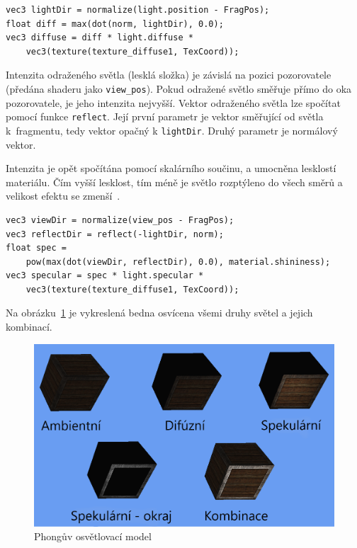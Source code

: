 \documentclass[thesis=M,czech]{FITthesis}[2019/12/23]
\begin{document}
\begin{verbatim}
vec3 lightDir = normalize(light.position - FragPos);
float diff = max(dot(norm, lightDir), 0.0);
vec3 diffuse = diff * light.diffuse * 
    vec3(texture(texture_diffuse1, TexCoord));
\end{verbatim}

Intenzita odraženého světla (lesklá složka) je závislá na pozici pozorovatele (předána shaderu jako \texttt{view\_pos}). Pokud odražené světlo směřuje přímo do oka pozorovatele, je jeho intenzita nejvyšší. Vektor odraženého světla lze spočítat pomocí funkce \texttt{reflect}. Její první parametr je vektor směřující od světla k~fragmentu, tedy vektor opačný k \texttt{lightDir}. Druhý parametr je nor\-mál\-ový vektor.

Intenzita je opět spočítána pomocí skalárního součinu, a umocněna lesklostí materiálu. Čím vyšší lesklost, tím méně je světlo rozptýleno do všech směrů a velikost efektu se zmenší~\cite{lopgl_basic_light}.

\begin{verbatim}
vec3 viewDir = normalize(view_pos - FragPos);
vec3 reflectDir = reflect(-lightDir, norm);
float spec = 
    pow(max(dot(viewDir, reflectDir), 0.0), material.shininess);
vec3 specular = spec * light.specular * 
    vec3(texture(texture_diffuse1, TexCoord));
\end{verbatim}

Na obrázku~\ref{fig:phong} je vykreslená bedna osvícena všemi druhy světel a jejich kombinací.

\begin{figure}\centering
	\includegraphics[width=\textwidth]{images/phong_adj}
	\caption[Phongův osvětlovací model]{Phongův osvětlovací model}\label{fig:phong}
\end{figure}
\end{document}
